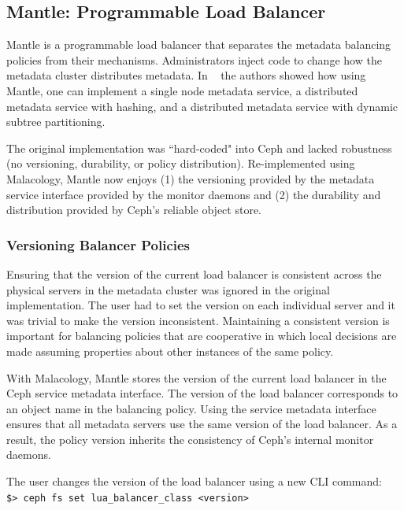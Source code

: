 \documentclass[preprint]{sigplanconf-eurosys}
\begin{document}
\subsection{Mantle: Programmable Load Balancer}
\label{sec:mantle}

Mantle is a programmable load balancer that separates the metadata balancing
policies from their mechanisms. Administrators inject code to change how the
metadata cluster distributes metadata. In ~\cite{sevilla:sc15-mantle} the
authors showed how using Mantle, one can implement a single node metadata
service, a distributed metadata service with hashing, and a distributed
metadata service with dynamic subtree partitioning. 

The original implementation was ``hard-coded" into Ceph and lacked robustness
(no versioning, durability, or policy distribution).  Re-implemented using
Malacology, Mantle now enjoys (1) the versioning provided by the metadata
service interface provided by the monitor daemons and (2) the durability and
distribution provided by Ceph's reliable object store.  

\subsubsection{Versioning Balancer Policies}

Ensuring that the version of the current load balancer is consistent across the
physical servers in the metadata cluster was ignored in the original
implementation. The user had to set the version on each individual server and
it was trivial to make the version inconsistent. Maintaining a consistent
version is important for balancing policies that are cooperative in which
local decisions are made assuming properties about other instances of the same
policy.

With Malacology, Mantle stores the version of the current load balancer in the
Ceph service metadata interface. The version of the load balancer
corresponds to an object name in the balancing policy. Using the service
metadata interface ensures that all metadata servers use the same version of
the load balancer. As a result, the policy version inherits the
consistency of Ceph's internal monitor daemons.

The user changes the version of the load balancer using a new CLI command: \\

\noindent \texttt{\$> ceph fs\ set\ lua\_balancer\_class\ \textless{}version\textgreater{}}
\end{document}
